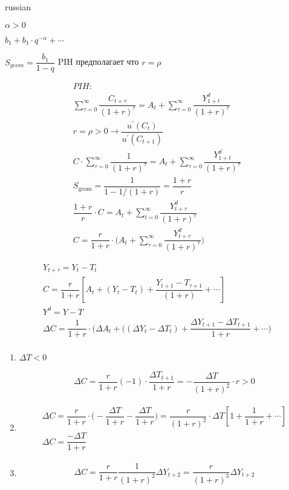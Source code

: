 \documentclass{article}
\begin{document}
\begin{otherlanguage*}{russian}
\begin{enumerate}
$ \alpha > 0 $ 

$ b_1 + b_1 \cdot q ^{-\alpha} + \cdots $ 

$ S_{geom} = \dfrac{b_1}{1 - q} $
PIH предполагает что $ r = \rho $

\begin{align*}
PIH: \\
\sum_{\tau = 0} ^ \infty \dfrac{C_{t+\tau}}{(1 +r)^\tau} = A_t + \sum_{\tau = 0}^\infty \dfrac{Y_{1+t}^d}{(1+r)^\tau} \\
r = \rho > 0 \rightarrow \dfrac{u^{'}(C_t)}{u^{'}(C_{t+1})} \\
C \cdot \sum_{\tau=0}^\infty \dfrac{1}{(1+r)^\tau} = A_t + \sum_{\tau = 0}^\infty \dfrac{Y_{1+t}^d}{(1+r)^\tau}  \\
S_{\operatorname{geom}} = \dfrac{1}{1 - 1 /(1+r)} = \dfrac{1+r}{r} \\
\dfrac{1+r}{r} \cdot C = A_t + \sum_{t = 0}^\infty \dfrac{Y^d_{t+\tau}}{(1+r)^\tau} \\
C = \dfrac{r}{1 + r} \cdot \Big( A_t + \sum_{\tau=0}^\infty \dfrac{Y_{t+\tau}^d}{(1+r)^\tau}\Big)
\end{align*}

\begin{align*}
Y_{t+\tau} = Y_t - T_t \\
C = \dfrac{r}{1+r} [ A_t + (Y_t - T_t) + \dfrac{Y_{t+1} - T_{\tau +1}}{(1+r)} + \cdots ] \\
Y^d = Y - T \\
\Delta C = \dfrac{1}{1 + r} \cdot \Big( \Delta A_t + ((\Delta Y_t - \Delta T_t) + \dfrac{\Delta Y_{t+1} - \Delta T_{t+1}}{1 +r} + \cdots \Big) \\
\end{align*}

\begin{enumerate}
\item $ \Delta T < 0 $ 

\begin{align*}
\Delta C = \dfrac{r}{1 + r} (-1) \cdot \dfrac{\Delta T_{t+1}}{1 + r} = -\dfrac{\Delta T}{(1+r)^2} \cdot r > 0
\end{align*}

\item 

\begin{align*}
\Delta C = \dfrac{r}{1 + r} \cdot \Big( - \dfrac{\Delta T}{1 + r} - \dfrac{\Delta T}{1+r}\Big) =  \dfrac{r}{(1+r)^2} \cdot \Delta T [ 1 + \dfrac{1}{1 + r} + \cdots ] \\
\Delta C = \dfrac{-\Delta T}{1 + r }
\end{align*}

\item 

\begin{align*}
\Delta C = \dfrac{r}{1+r} \dfrac{1}{(1+r)^2} \Delta Y_{t+2} = \dfrac{r}{(1+r)^3} \Delta Y_{t+2} 
\end{align*}
\end{enumerate}
\end{enumerate}
\end{otherlanguage*} 
\end{document}
